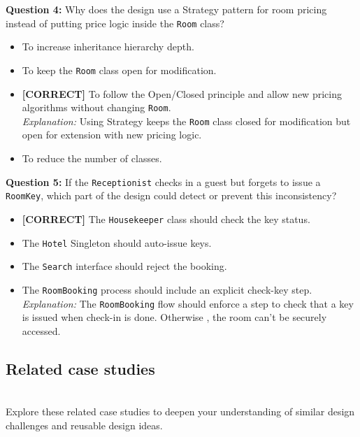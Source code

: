 \vspace{0.3cm}
\noindent
\textbf{Question 4:} Why does the design use a Strategy pattern for room pricing instead of putting price logic inside the \texttt{Room} class?
\\[0.2cm]
\begin{itemize}
 \item To increase inheritance hierarchy depth.
 \item To keep the \texttt{Room} class open for modification.
 \item \textbf{[CORRECT]} To follow the Open/Closed principle and allow new pricing algorithms without changing \texttt{Room}.
\\[0.1cm]
\textit{Explanation:} 
Using Strategy keeps the \texttt{Room} class closed for modification but open for extension with new pricing logic.
 \item To reduce the number of classes.
\end{itemize}
\vspace{0.3cm}
\noindent
\textbf{Question 5:} If the \texttt{Receptionist} checks in a guest but forgets to issue a \texttt{RoomKey}, which part of the design could detect or prevent this inconsistency?
\\[0.2cm]
\begin{itemize}
 \item \textbf{[CORRECT]} The \texttt{Housekeeper} class should check the key status.
 \item The \texttt{Hotel} Singleton should auto-issue keys.
 \item The \texttt{Search} interface should reject the booking.
 \item The \texttt{RoomBooking} process should include an explicit check-key step.
\\[0.1cm]
\textit{Explanation:} 
The \texttt{RoomBooking} flow should enforce a step to check that a key is issued when check-in is done. Otherwise , the room can't be securely accessed.
\end{itemize}

\subsection{Related case studies}\label{K3mySFDAVTtf0SgiSlcQb}
\\
Explore these related case studies to deepen your understanding of similar design challenges and reusable design ideas.

